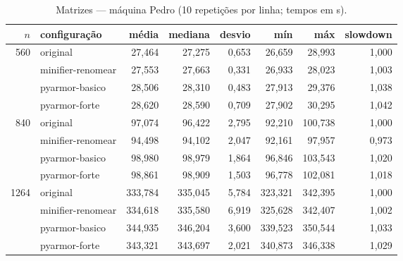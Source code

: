 \begin{table}[ht]\centering\footnotesize
\caption{Matrizes --- máquina Pedro (10 repetições por linha; tempos em s).}\label{tab:pedro-matrizes}
\begin{tabular}{rlrrrrrr}\hline
$n$ & configuração & média & mediana & desvio & mín & máx & slowdown \\\hline
560 & original & 27,464 & 27,275 & 0,653 & 26,659 & 28,993 & 1,000 \\
 & minifier-renomear & 27,553 & 27,663 & 0,331 & 26,933 & 28,023 & 1,003 \\
 & pyarmor-basico & 28,506 & 28,310 & 0,483 & 27,913 & 29,376 & 1,038 \\
 & pyarmor-forte & 28,620 & 28,590 & 0,709 & 27,902 & 30,295 & 1,042 \\
\hline
840 & original & 97,074 & 96,422 & 2,795 & 92,210 & 100,738 & 1,000 \\
 & minifier-renomear & 94,498 & 94,102 & 2,047 & 92,161 & 97,957 & 0,973 \\
 & pyarmor-basico & 98,980 & 98,979 & 1,864 & 96,846 & 103,543 & 1,020 \\
 & pyarmor-forte & 98,861 & 98,909 & 1,503 & 96,778 & 102,081 & 1,018 \\
\hline
1264 & original & 333,784 & 335,045 & 5,784 & 323,321 & 342,395 & 1,000 \\
 & minifier-renomear & 334,618 & 335,580 & 6,919 & 325,628 & 342,407 & 1,002 \\
 & pyarmor-basico & 344,935 & 346,204 & 3,600 & 339,523 & 350,544 & 1,033 \\
 & pyarmor-forte & 343,321 & 343,697 & 2,021 & 340,873 & 346,338 & 1,029 \\
\hline
\end{tabular}\end{table}

